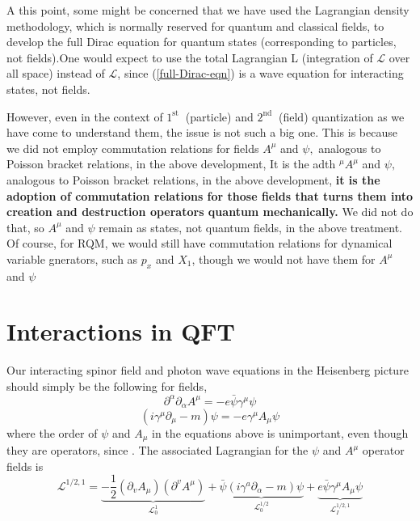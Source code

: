 \begin{mybox}
A this point, some might be concerned that we have used the Lagrangian density methodology, which is normally reserved for quantum and classical fields, to develop the full Dirac equation for quantum states (corresponding to particles, not fields).One would expect to use the
total Lagrangian L (integration of $\mathcal{L}$ over all space) instead of $\mathcal{L}$, since (\ref{full-Dirac-eqn}) is a wave equation for interacting states, not fields.

However, even in the context of $1^{\text {st }}$ (particle) and $2^{\text {nd }}$ (field) quantization as we have come to understand them, the issue is not such a big one. This is because we did not employ commutation relations for fields $A^{\mu}$ and $\psi,$ analogous to Poisson bracket relations, in the above development, It is the adth $^{\mu} A^{\mu}$ and $\psi,$ analogous to Poisson bracket relations, in the above development, \textbf{it is the adoption of commutation relations for those fields that turns them into creation and destruction operators quantum mechanically.} We did not do that, so $A^{\mu}$ and $\psi$ remain as states, not quantum fields, in the above treatment. Of course, for RQM, we would still have commutation relations for dynamical variable gnerators, such as $p_{x}$ and $X_{1}$, though we would not have them for $A^{\mu}$ and $\psi$
\end{mybox}
\section{Interactions in QFT}
Our interacting spinor field and photon wave equations in the Heisenberg picture should simply be the following for fields,
\begin{equation}
\partial^{\alpha} \partial_{\alpha} A^{\mu}=-e \bar{\psi} \gamma^{\mu} \psi
\label{fields-interaction-wave-eqn-1}
\end{equation}
\begin{equation}
\left(i \gamma^{\mu} \partial_{\mu}-m\right) \psi=-e \gamma^{\mu} A_{\mu} \psi
\label{fields-interaction-wave-eqn-2}
\end{equation}
where the order of $\psi$ and $A_{\mu}$ in the equations above is unimportant, even though they are operators, since . The associated Lagrangian for the $\psi$ and $A^{\mu}$ operator fields is
\begin{equation}
\mathcal{L}^{1 / 2,1}=\underbrace{-\frac{1}{2}\left(\partial_{v} A_{\mu}\right)\left(\partial^{v} A^{\mu}\right)}_{\mathcal{L}_{0}^{1}}+\underbrace{\bar{\psi}\left(i \gamma^{a} \partial_{\alpha}-m\right) \psi}_{\mathcal{L}_0^{1/2}}+\underbrace{e \bar{\psi} \gamma^{\mu} A_{\mu} \psi}_{\mathcal{L}_{I}^{1 / 2,1}}
\end{equation}

